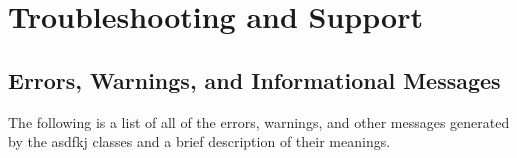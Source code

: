 \documentclass{tufte-book}
\begin{document}
\chapter{Troubleshooting and Support}
\label{ch:troubleshooting}

\section{Errors, Warnings, and Informational Messages}\label{sec:tl-messages}
The following is a list of all of the errors, warnings, and other messages generated by the asdfkj classes and a brief description of their meanings.

\backmatter



\end{document}
